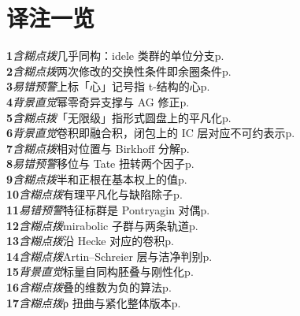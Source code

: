 \chapter*{译注一览}
\begin{multicols}{2}\small
\noindent\textbf{1}\;\textit{含糊点拨}\;几乎同构：idele 类群的单位分支\hfill p.\,\pageref{tn:1}\\[1pt]
\noindent\textbf{2}\;\textit{含糊点拨}\;两次修改的交换性条件即余圈条件\hfill p.\,\pageref{tn:2}\\[1pt]
\noindent\textbf{3}\;\textit{易错预警}\;上标「心」记号指 t-结构的心\hfill p.\,\pageref{tn:3}\\[1pt]
\noindent\textbf{4}\;\textit{背景直觉}\;幂零奇异支撑与 AG 修正\hfill p.\,\pageref{tn:4}\\[1pt]
\noindent\textbf{5}\;\textit{含糊点拨}\;「无限级」指形式圆盘上的平凡化\hfill p.\,\pageref{tn:5}\\[1pt]
\noindent\textbf{6}\;\textit{背景直觉}\;卷积即融合积，闭包上的 IC 层对应不可约表示\hfill p.\,\pageref{tn:6}\\[1pt]
\noindent\textbf{7}\;\textit{含糊点拨}\;相对位置与 Birkhoff 分解\hfill p.\,\pageref{tn:7}\\[1pt]
\noindent\textbf{8}\;\textit{易错预警}\;移位与 Tate 扭转两个因子\hfill p.\,\pageref{tn:8}\\[1pt]
\noindent\textbf{9}\;\textit{含糊点拨}\;半和正根在基本权上的值\hfill p.\,\pageref{tn:9}\\[1pt]
\noindent\textbf{10}\;\textit{含糊点拨}\;有理平凡化与缺陷除子\hfill p.\,\pageref{tn:10}\\[1pt]
\noindent\textbf{11}\;\textit{易错预警}\;特征标群是 Pontryagin 对偶\hfill p.\,\pageref{tn:11}\\[1pt]
\noindent\textbf{12}\;\textit{含糊点拨}\;mirabolic 子群与两条轨道\hfill p.\,\pageref{tn:12}\\[1pt]
\noindent\textbf{13}\;\textit{含糊点拨}\;沿 Hecke 对应的卷积\hfill p.\,\pageref{tn:13}\\[1pt]
\noindent\textbf{14}\;\textit{含糊点拨}\;Artin–Schreier 层与洁净判别\hfill p.\,\pageref{tn:14}\\[1pt]
\noindent\textbf{15}\;\textit{背景直觉}\;标量自同构胚叠与刚性化\hfill p.\,\pageref{tn:15}\\[1pt]
\noindent\textbf{16}\;\textit{含糊点拨}\;叠的维数为负的算法\hfill p.\,\pageref{tn:16}\\[1pt]
\noindent\textbf{17}\;\textit{含糊点拨}\;ρ 扭曲与紧化整体版本\hfill p.\,\pageref{tn:17}\\[1pt]

\end{multicols}
